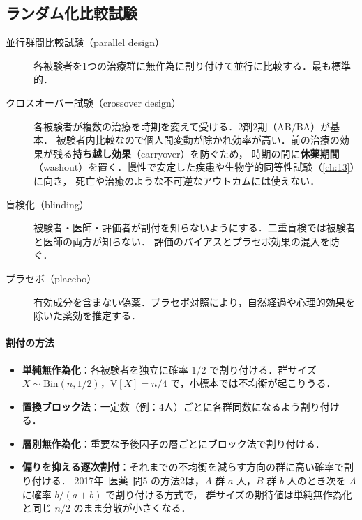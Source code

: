 \documentclass[a4paper,11pt,openany]{ltjsbook}
\newcommand{\kakomon}[2]{\mbox{#1年 医薬 問#2}}
\newcommand{\V}{\mathrm{V}}
\newcommand{\Bin}{\mathrm{Bin}}
\newcommand{\emphx}[1]{\textbf{\textcolor{bkblue}{#1}}}
\begin{document}
\subsection{ランダム化比較試験}\label{subsec:02-rct}
\begin{description}
\item[並行群間比較試験（parallel design）] 各被験者を1つの治療群に無作為に割り付けて並行に比較する．最も標準的．
\item[クロスオーバー試験（crossover design）] 各被験者が複数の治療を時期を変えて受ける．2剤2期（AB/BA）が基本．
      被験者内比較なので個人間変動が除かれ効率が高い．前の治療の効果が残る\emphx{持ち越し効果}（carryover）を防ぐため，
      時期の間に\emphx{休薬期間}（washout）を置く．慢性で安定した疾患や生物学的同等性試験（\cref{ch:13}）に向き，
      死亡や治癒のような不可逆なアウトカムには使えない．
\item[盲検化（blinding）] 被験者・医師・評価者が割付を知らないようにする．二重盲検では被験者と医師の両方が知らない．
      評価のバイアスとプラセボ効果の混入を防ぐ．
\item[プラセボ（placebo）] 有効成分を含まない偽薬．プラセボ対照により，自然経過や心理的効果を除いた薬効を推定する．
\end{description}

\paragraph{割付の方法}
\begin{itemize}
\item \textbf{単純無作為化}：各被験者を独立に確率 $1/2$ で割り付ける．群サイズ $X\sim\Bin(n,1/2)$，$\V[X]=n/4$ で，小標本では不均衡が起こりうる．
\item \textbf{置換ブロック法}：一定数（例：4人）ごとに各群同数になるよう割り付ける．
\item \textbf{層別無作為化}：重要な予後因子の層ごとにブロック法で割り付ける．
\item \textbf{偏りを抑える逐次割付}：それまでの不均衡を減らす方向の群に高い確率で割り付ける．
      \kakomon{2017}{5} の方法2は，$A$ 群 $a$ 人，$B$ 群 $b$ 人のとき次を $A$ に確率 $b/(a+b)$ で割り付ける方式で，
      群サイズの期待値は単純無作為化と同じ $n/2$ のまま分散が小さくなる．
\end{itemize}
\end{document}
